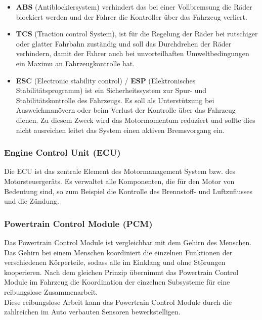         \begin{itemize}
            \item \textbf{ABS} (Antiblockiersystem) verhindert das bei einer Vollbremsung die Räder
            blockiert werden und der Fahrer die Kontroller über das Fahrzeug verliert.
            ~\cite{antiblockiersys.PB1}

            \item \textbf{TCS} (Traction control System), ist für die Regelung der Räder bei rutschiger oder glatter Fahrbahn zuständig
            und soll das Durchdrehen der Räder verhindern, damit der Fahrer auch bei unvorteilhaften Umweltbedingungen ein
            Maximu an Fahrzeugkontrolle hat.
            ~\cite{tractioncontrol.PB1}

            \item \textbf{ESC} (Electronic stability control) / \textbf{ESP} (Elektronisches Stabilitätsprogramm)
            ist ein Sicherheitssystem zur Spur- und Stabilitätskontrolle des Fahrzeugs.
            Es soll als Unterstützung bei Ausweichmanövern oder beim Verlust der Kontrolle über das Fahrzeug dienen. 
            Zu diesem Zweck wird das Motormomentum reduziert und sollte dies nicht ausreichen leitet das System einen aktiven
            Bremsvorgang ein.
            ~\cite{ESP.PB1}
        \end{itemize}

        \subsubsection{Engine Control Unit (ECU)}
        Die ECU ist das zentrale Element des Motormanagement System bzw. des Motorsteuergeräts. Es verwaltet alle
        Komponenten, die für den Motor von Bedeutung sind, so zum Beispiel die Kontrolle des Brennstoff- und Luftzuflusses und die Zündung.
        ~\cite{enginecontrol.PB1} 

        \subsubsection{Powertrain Control Module (PCM)}
        Das Powertrain Control Module ist vergleichbar mit dem Gehirn des Menschen. Das Gehirn bei einem Menschen
        koordiniert die einzelnen Funktionen der verschiedenen Körperteile, sodass alle im Einklang und ohne
        Störungen kooperieren. Nach dem gleichen Prinzip übernimmt das Powertrain Control Module im Fahrzeug die Koordination der einzelnen
        Subsysteme für eine reibungslose Zusammenarbeit.\\ Diese reibungslose Arbeit kann das Powertrain
        Control Module durch die zahlreichen im Auto verbauten Sensoren bewerkstelligen.
        ~\cite{PCM.PB1}

